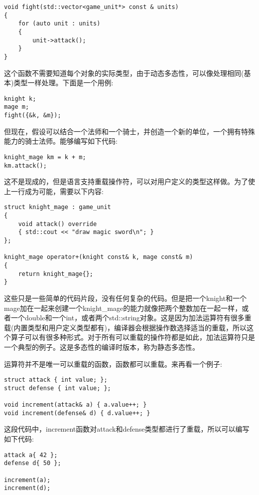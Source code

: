 \begin{lstlisting}[style=styleCXX]
void fight(std::vector<game_unit*> const & units)
{
	for (auto unit : units)
	{
		unit->attack();
	}
}
\end{lstlisting}

这个函数不需要知道每个对象的实际类型，由于动态多态性，可以像处理相同(基本)类型一样处理。下面是一个用例:

\begin{lstlisting}[style=styleCXX]
knight k;
mage m;
fight({&k, &m});
\end{lstlisting}

但现在，假设可以结合一个法师和一个骑士，并创造一个新的单位，一个拥有特殊能力的骑士法师。能够编写如下代码:

\begin{lstlisting}[style=styleCXX]
knight_mage km = k + m;
km.attack();
\end{lstlisting}

这不是现成的，但是语言支持重载操作符，可以对用户定义的类型这样做。为了使上一行成为可能，需要以下内容:

\begin{lstlisting}[style=styleCXX]
struct knight_mage : game_unit
{
	void attack() override
	{ std::cout << "draw magic sword\n"; }
};

knight_mage operator+(knight const& k, mage const& m)
{
	return knight_mage{};
}
\end{lstlisting}

这些只是一些简单的代码片段，没有任何复杂的代码。但是把一个knight和一个mage加在一起来创建一个knight\_mage的能力就像把两个整数加在一起一样，或者一个double和一个int，或者两个std::string对象。这是因为加法运算符有很多重载(内置类型和用户定义类型都有)，编译器会根据操作数选择适当的重载，所以这个算子可以有很多种形式。对于所有可以重载的操作符都是如此，加法运算符只是一个典型的例子。这是多态性的编译时版本，称为静态多态性。

运算符并不是唯一可以重载的函数，函数都可以重载。来再看一个例子:

\begin{lstlisting}[style=styleCXX]
struct attack { int value; };
struct defense { int value; };

void increment(attack& a) { a.value++; }
void increment(defense& d) { d.value++; }
\end{lstlisting}

这段代码中，increment函数对attack和defense类型都进行了重载，所以可以编写如下代码:

\begin{lstlisting}[style=styleCXX]
attack a{ 42 };
defense d{ 50 };

increment(a);
increment(d);
\end{lstlisting}

